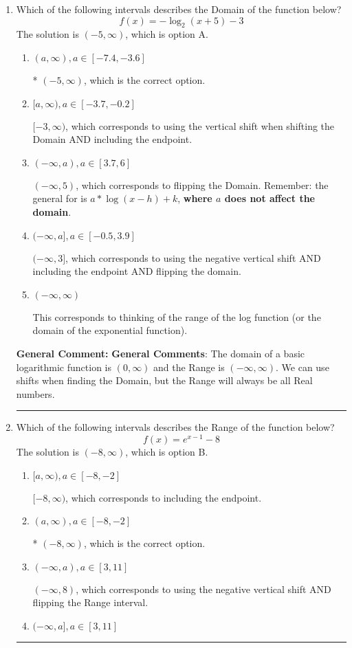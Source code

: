 \documentclass{extbook}[14pt]
\newcommand{\litem}[1]{\item #1

\rule{\textwidth}{0.4pt}}
\begin{document}
\begin{enumerate}\litem{
Which of the following intervals describes the Domain of the function below?
\[ f(x) = -\log_2{(x+5)}-3 \]The solution is \( (-5, \infty) \), which is option A.\begin{enumerate}[label=\Alph*.]
\item \( (a, \infty), a \in [-7.4, -3.6] \)

* $(-5, \infty)$, which is the correct option.
\item \( [a, \infty), a \in [-3.7, -0.2] \)

$[-3, \infty)$, which corresponds to using the vertical shift when shifting the Domain AND including the endpoint.
\item \( (-\infty, a), a \in [3.7, 6] \)

$(-\infty, 5)$, which corresponds to flipping the Domain. Remember: the general for is $a*\log(x-h)+k$, \textbf{where $a$ does not affect the domain}.
\item \( (-\infty, a], a \in [-0.5, 3.9] \)

$(-\infty, 3]$, which corresponds to using the negative vertical shift AND including the endpoint AND flipping the domain.
\item \( (-\infty, \infty) \)

This corresponds to thinking of the range of the log function (or the domain of the exponential function).
\end{enumerate}

\textbf{General Comment:} \textbf{General Comments}: The domain of a basic logarithmic function is $(0, \infty)$ and the Range is $(-\infty, \infty)$. We can use shifts when finding the Domain, but the Range will always be all Real numbers.
}
\litem{
Which of the following intervals describes the Range of the function below?
\[ f(x) = e^{x-1}-8 \]The solution is \( (-8, \infty) \), which is option B.\begin{enumerate}[label=\Alph*.]
\item \( [a, \infty), a \in [-8, -2] \)

$[-8, \infty)$, which corresponds to including the endpoint.
\item \( (a, \infty), a \in [-8, -2] \)

* $(-8, \infty)$, which is the correct option.
\item \( (-\infty, a), a \in [3, 11] \)

$(-\infty, 8)$, which corresponds to using the negative vertical shift AND flipping the Range interval.
\item \( (-\infty, a], a \in [3, 11] \)


\end{enumerate}}
\end{enumerate}
\end{document}
